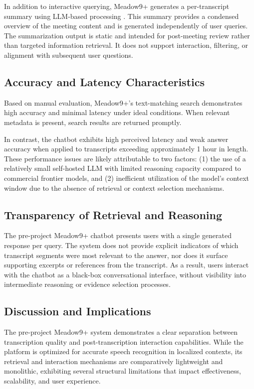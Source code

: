 In addition to interactive querying, Meadow9+ generates a per-transcript summary using LLM-based processing \cite{meadow9_appstore_us}. This summary provides a condensed overview of the meeting content and is generated independently of user queries. The summarization output is static and intended for post-meeting review rather than targeted information retrieval. It does not support interaction, filtering, or alignment with subsequent user questions.

\subsection{Accuracy and Latency Characteristics}
Based on manual evaluation, Meadow9+’s text-matching search demonstrates high accuracy and minimal latency under ideal conditions. When relevant metadata is present, search results are returned promptly.

In contrast, the chatbot exhibits high perceived latency and weak answer accuracy when applied to transcripts exceeding approximately 1 hour in length. These performance issues are likely attributable to two factors: (1) the use of a relatively small self-hosted LLM with limited reasoning capacity compared to commercial frontier models, and (2) inefficient utilization of the model’s context window due to the absence of retrieval or context selection mechanisms.

\subsection{Transparency of Retrieval and Reasoning}
The pre-project Meadow9+ chatbot presents users with a single generated response per query. The system does not provide explicit indicators of which transcript segments were most relevant to the answer, nor does it surface supporting excerpts or references from the transcript. As a result, users interact with the chatbot as a black-box conversational interface, without visibility into intermediate reasoning or evidence selection processes.

\subsection{Discussion and Implications}
The pre-project Meadow9+ system demonstrates a clear separation between transcription quality and post-transcription interaction capabilities. While the platform is optimized for accurate speech recognition in localized contexts, its retrieval and interaction mechanisms are comparatively lightweight and monolithic, exhibiting several structural limitations that impact effectiveness, scalability, and user experience.

